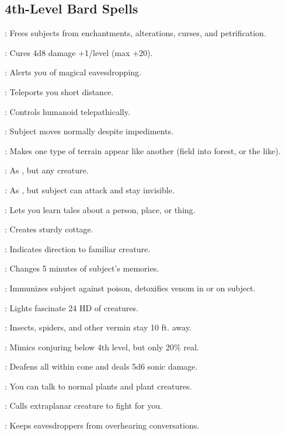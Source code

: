 \begin{multicols}{2}
\subsection{4th-Level Bard Spells}
\begin{description*}
\item[\linkspell{Break Enchantment}:] Frees subjects from enchantments, alterations, curses, and petrification.
\item[\linkspell{Cure Critical Wounds}:] Cures 4d8 damage +1/level (max +20).
\item[\linkspell{Detect Scrying}:] Alerts you of magical eavesdropping.
\item[\linkspell{Dimension Door}:] Teleports you short distance.
\item[\linkspell{Dominate Person}:] Controls humanoid telepathically.
\item[\linkspell{Freedom of Movement}:] Subject moves normally despite impediments.
\item[\linkspell{Hallucinatory Terrain}:] Makes one type of terrain appear like another (field into forest, or the like).
\item[\linkspell{Hold Monster}:] As , but any creature.
\item[\linkspell{Invisibility, Greater}:] As , but subject can attack and stay invisible.
\item[\linkspell{Legend Lore}:] Lets you learn tales about a person, place, or thing.
\item[\linkspell{Leomund’s Secure Shelter}:] Creates sturdy cottage.
\item[\linkspell{Locate Creature}:] Indicates direction to familiar creature.
\item[\linkspell{Modify Memory}:] Changes 5 minutes of subject’s memories.
\item[\linkspell{Neutralize Poison}:] Immunizes subject against poison, detoxifies venom in or on subject.
\item[\linkspell{Rainbow Pattern}:] Lights fascinate 24 HD of creatures.
\item[\linkspell{Repel Vermin}:] Insects, spiders, and other vermin stay 10 ft. away.
\item[\linkspell{Shadow Conjuration}:] Mimics conjuring below 4th level, but only 20\% real.
\item[\linkspell{Shout}:] Deafens all within cone and deals 5d6 sonic damage.
\item[\linkspell{Speak with Plants}:] You can talk to normal plants and plant creatures.
\item[\linkspell{Summon Monster IV}:] Calls extraplanar creature to fight for you.
\item[\linkspell{Zone of Silence}:] Keeps eavesdroppers from overhearing conversations.
\end{description*}


\end{multicols}
